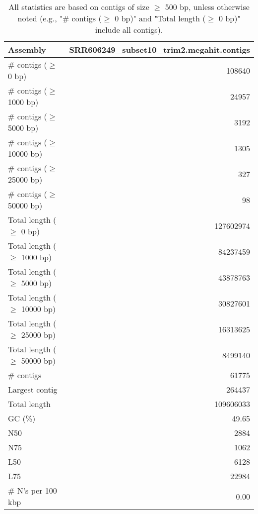 \documentclass[12pt,a4paper]{article}
\begin{document}
\begin{table}[ht]
\begin{center}
\caption{All statistics are based on contigs of size $\geq$ 500 bp, unless otherwise noted (e.g., "\# contigs ($\geq$ 0 bp)" and "Total length ($\geq$ 0 bp)" include all contigs).}
\begin{tabular}{|l*{1}{|r}|}
\hline
Assembly & SRR606249\_subset10\_trim2.megahit.contigs \\ \hline
\# contigs ($\geq$ 0 bp) & 108640 \\ \hline
\# contigs ($\geq$ 1000 bp) & 24957 \\ \hline
\# contigs ($\geq$ 5000 bp) & 3192 \\ \hline
\# contigs ($\geq$ 10000 bp) & 1305 \\ \hline
\# contigs ($\geq$ 25000 bp) & 327 \\ \hline
\# contigs ($\geq$ 50000 bp) & 98 \\ \hline
Total length ($\geq$ 0 bp) & 127602974 \\ \hline
Total length ($\geq$ 1000 bp) & 84237459 \\ \hline
Total length ($\geq$ 5000 bp) & 43878763 \\ \hline
Total length ($\geq$ 10000 bp) & 30827601 \\ \hline
Total length ($\geq$ 25000 bp) & 16313625 \\ \hline
Total length ($\geq$ 50000 bp) & 8499140 \\ \hline
\# contigs & 61775 \\ \hline
Largest contig & 264437 \\ \hline
Total length & 109606033 \\ \hline
GC (\%) & 49.65 \\ \hline
N50 & 2884 \\ \hline
N75 & 1062 \\ \hline
L50 & 6128 \\ \hline
L75 & 22984 \\ \hline
\# N's per 100 kbp & 0.00 \\ \hline
\end{tabular}
\end{center}
\end{table}
\end{document}
